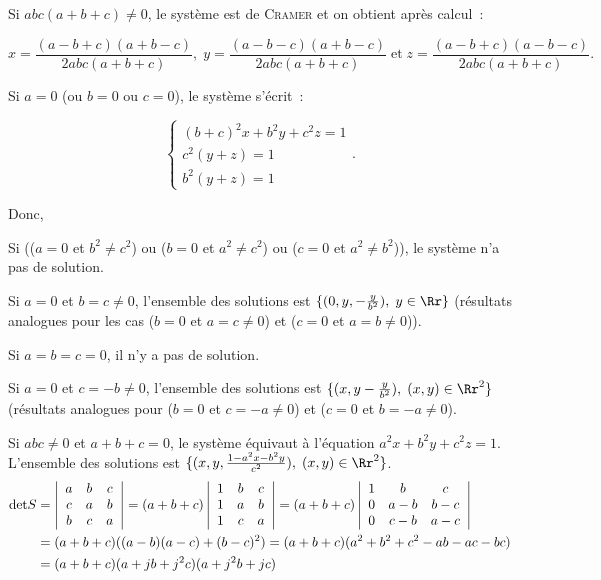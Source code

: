{{Si $abc(a+b+c)\neq0$, le système est de \textsc{Cramer} et on obtient après calcul~:

$$x=\frac{(a-b+c)(a+b-c)}{2abc(a+b+c)},\;y=\frac{(a-b-c)(a+b-c)}{2abc(a+b+c)}\;\mbox{et}\;z=\frac{(a-b+c)(a-b-c)}{2abc(a+b+c)}.$$ 

Si $a=0$ (ou $b=0$ ou $c=0$), le système s'écrit~:

$$\left\{
\begin{array}{l}
(b+c)^2x+b^2y+c^2z=1\\
c^2(y+z)=1\\
b^2(y+z)=1
\end{array}
\right.
.$$

Donc,

Si (($a=0$ et $b^2\neq c^2$) ou ($b=0$ et $a^2\neq c^2$) ou ($c=0$ et $a^2\neq b^2$)), le système n'a pas de solution.

Si $a=0$ et $b=c\neq 0$, l'ensemble des solutions est $\{(0,y,-\frac{y}{b^2}),\;y\in\Rr\}$ (résultats analogues pour les cas ($b=0$ et $a=c\neq 0$) et ($c=0$ et $a=b\neq0$)).

Si $a=b=c=0$, il n'y a pas de solution.
 
Si $a=0$ et $c=-b\neq0$, l'ensemble des solutions est $\{(x,y-\frac{y}{b^2}),\;(x,y)\in\Rr^2\}$ (résultats analogues pour ($b=0$ et $c=-a\neq0$) et ($c=0$ et $b=-a\neq0$).

Si $abc\neq0$ et $a+b+c=0$, le système équivaut à l'équation $a^2x+b^2y+c^2z=1$. L'ensemble  des solutions est $\{(x,y,\frac{1-a^2x-b^2y}{c^2}),\;(x,y)\in\Rr^2\}$.
\begin{align*}\ensuremath
\mbox{det}S&=\left|
\begin{array}{ccc}
a&b&c\\
c&a&b\\
b&c&a
\end{array}
\right|=(a+b+c)\left|
\begin{array}{ccc}
1&b&c\\
1&a&b\\
1&c&a
\end{array}
\right|
=(a+b+c)\left|
\begin{array}{ccc}
1&b&c\\
0&a-b&b-c\\
0&c-b&a-c
\end{array}
\right|\\
 &=(a+b+c)((a-b)(a-c)+(b-c)^2)=(a+b+c)(a^2+b^2+c^2-ab-ac-bc)\\
 &=(a+b+c)(a+jb+j^2c)(a+j^2b+jc)
\end{align*}

}}
